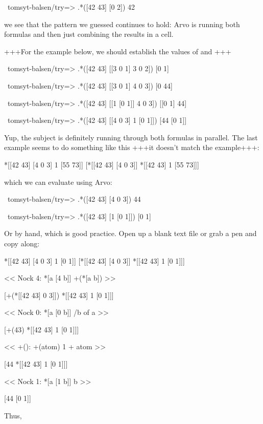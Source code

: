 \begin{code}
~tomsyt-balsen/try=> .*([42 43] [0 2])
42
\end{code}

we see that the pattern we guessed continues to hold: Arvo is running both formulas and then just combining the results in a cell.

+++For the example below, we should establish the values of  and +++

\begin{code}
~tomsyt-balsen/try=> .*([42 43] [[3 0 1] 3 0 2])
[0 1]

~tomsyt-balsen/try=> .*([42 43] [[3 0 1] 4 0 3])
[0 44]

~tomsyt-balsen/try=> .*([42 43] [[1 [0 1]] 4 0 3])
[[0 1] 44]

~tomsyt-balsen/try=> .*([42 43] [[4 0 3] 1 [0 1]])
[44 [0 1]]
\end{code}

Yup, the subject is definitely running through both formulas in parallel. The
last example seems to do something like this +++it doesn't match the example+++:

\begin{code}
*[[42 43] [4 0 3] 1 [55 73]]         [*[[42 43] [4 0 3]] *[[42 43] 1 [55 73]]]
\end{code}

which we can evaluate using Arvo:

\begin{code}
~tomsyt-balsen/try=> .*([42 43] [4 0 3])
44

~tomsyt-balsen/try=> .*([42 43] [1 [0 1]])
[0 1]
\end{code}

Or by hand, which is good practice. Open up a blank text file or grab a pen and
copy along:

\begin{code}
*[[42 43] [4 0 3] 1 [0 1]]  [*[[42 43] [4 0 3]] *[[42 43] 1 [0 1]]]

<<  Nock 4:       *[a [4 b]]          +(*[a b]) >>

[+(*[[42 43] 0 3]]) *[[42 43] 1 [0 1]]]

<<  Nock 0:       *[a [0 b]]          /b of a  >>

[+(43) *[[42 43] 1 [0 1]]]

<<     +():       +(atom)             1 + atom  >>

[44 *[[42 43] 1 [0 1]]]

<<  Nock 1:       *[a [1 b]]          b  >>

[44 [0 1]]
\end{code}
Thus,

